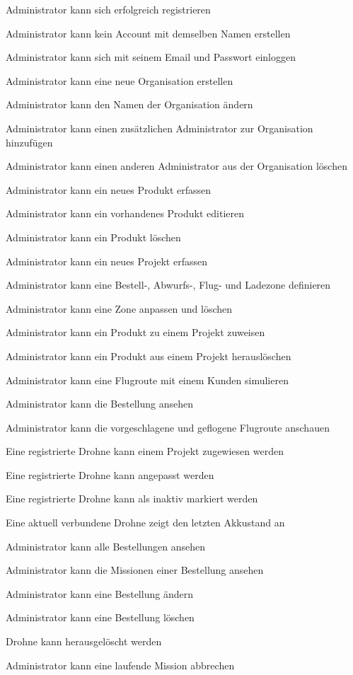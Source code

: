 \begin{todolist}
	\item[\done] Administrator kann sich erfolgreich registrieren
	\item Administrator kann kein Account mit demselben Namen erstellen
	\item[\done] Administrator kann sich mit seinem Email und Passwort einloggen
	\item[\done] Administrator kann eine neue Organisation erstellen
	\item[\done] Administrator kann den Namen der Organisation ändern
	\item Administrator kann einen zusätzlichen Administrator zur Organisation hinzufügen
	\item Administrator kann einen anderen Administrator aus der Organisation  löschen
	\item[\done] Administrator kann ein neues Produkt erfassen
	\item[\done] Administrator kann ein vorhandenes Produkt editieren
	\item[\done] Administrator kann ein Produkt löschen
	\item[\done] Administrator kann ein neues Projekt erfassen
	\item Administrator kann eine Bestell-, Abwurfs-, Flug- und Ladezone definieren
	\item Administrator kann eine Zone anpassen und löschen
	\item Administrator kann ein Produkt zu einem Projekt zuweisen
	\item Administrator kann ein Produkt aus einem Projekt herauslöschen
	\item Administrator kann eine Flugroute mit einem Kunden simulieren
	
	\item Administrator kann die Bestellung ansehen
	\item Administrator kann die vorgeschlagene und geflogene Flugroute anschauen
	
	\item[\done] Eine registrierte Drohne kann einem Projekt zugewiesen werden
	\item Eine registrierte Drohne kann angepasst werden
	\item Eine registrierte Drohne kann als inaktiv markiert werden
	\item Eine aktuell verbundene Drohne zeigt den letzten Akkustand an
	\item Administrator kann alle Bestellungen ansehen
	\item Administrator kann die Missionen einer Bestellung ansehen
	
	\item Administrator kann eine Bestellung ändern 
	\item Administrator kann eine Bestellung löschen 
	\item Drohne kann herausgelöscht werden 
	
	\item Administrator kann eine laufende Mission abbrechen 
\end{todolist}

